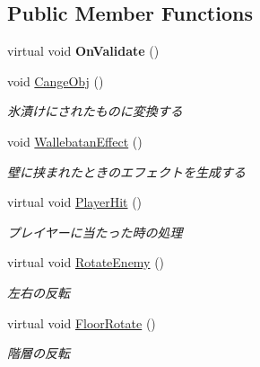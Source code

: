 \subsection*{Public Member Functions}
\begin{DoxyCompactItemize}
\item 
\mbox{\label{class_enemy_af27fad17c4ee829c70ad2d3388d27f89}} 
virtual void {\bfseries On\+Validate} ()
\item 
void \hyperlink{class_enemy_acd99666df643c0fea93610769b5bd214}{Cange\+Obj} ()
\begin{DoxyCompactList}\small\item\em 氷漬けにされたものに変換する \end{DoxyCompactList}\item 
void \hyperlink{class_enemy_a5b96db39bbd412b91fb3923a6833e6b5}{Wallebatan\+Effect} ()
\begin{DoxyCompactList}\small\item\em 壁に挟まれたときのエフェクトを生成する \end{DoxyCompactList}\item 
virtual void \hyperlink{class_enemy_a2b5e9b4644bd49c33279403c6477ed39}{Player\+Hit} ()
\begin{DoxyCompactList}\small\item\em プレイヤーに当たった時の処理 \end{DoxyCompactList}\item 
virtual void \hyperlink{class_enemy_a2a0e665070fd362bd3ab2f2962ebff93}{Rotate\+Enemy} ()
\begin{DoxyCompactList}\small\item\em 左右の反転 \end{DoxyCompactList}\item 
virtual void \hyperlink{class_enemy_add93027b5ee19288ed26aa6f98fb88f8}{Floor\+Rotate} ()
\begin{DoxyCompactList}\small\item\em 階層の反転 \end{DoxyCompactList}\end{DoxyCompactItemize}
